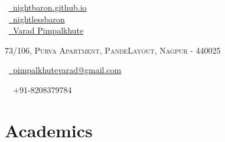 \documentclass[a4paper,10pt]{extarticle} %
\begin{document}
\pagestyle{empty} %


\begin{multicols}{3}
\normalsize  \faGlobe\ {\href{https://nightbaron.github.io/}{\  nightbaron.github.io}}\\
\normalsize \faGithub\ {\href{https://github.com/nightlessbaron}{\  nightlessbaron}}\\
\normalsize  \faLinkedinSquare\ {\href{https://www.linkedin.com/in/varad-pimpalkhute-a526a9167/}{\  Varad Pimpalkhute}}\\
\columnbreak
\normalsize\par{\centering{\huge\textsc{\textcolor{primary}{Varad Pimpalkhute}}}\par} %
\par{\centering\normalsize {\textsc{73/106, Purva Apartment, PandeLayout, Nagpur - 440025}}\hfill\par}
\columnbreak
\raggedright\hfill\normalsize \faEnvelope\ {\href{pimpalkhutevarad@gmail.com}{\  pimpalkhutevarad@gmail.com}}\\
\raggedright\hfill{\faPhone\ \  +91-8208379784}
\end{multicols}


\vspace{-0.6cm}
\section{\textcolor{primary}{Academics}}
\end{document}
